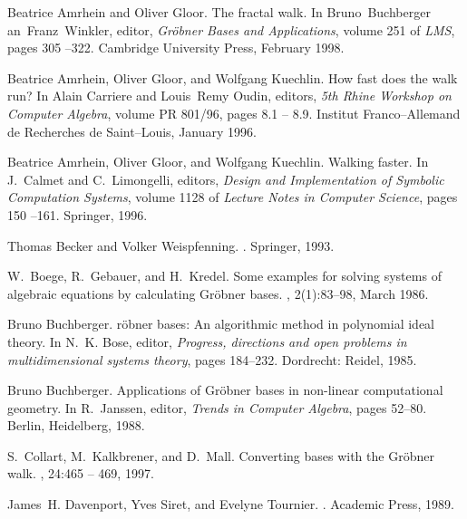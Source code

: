 \begin{thebibliography}{10}

Beatrice Amrhein and Oliver Gloor.
\newblock The fractal walk.
\newblock In Bruno~Buchberger an~Franz~Winkler, editor, {\em Gr\"obner Bases
  and Applications}, volume 251 of {\em LMS}, pages 305 --322. Cambridge
  University Press, February 1998.

Beatrice Amrhein, Oliver Gloor, and Wolfgang Kuechlin.
\newblock How fast does the walk run?
\newblock In Alain Carriere and Louis~Remy Oudin, editors, {\em 5th Rhine
  Workshop on Computer Algebra}, volume PR 801/96, pages 8.1 -- 8.9. Institut
  Franco--Allemand de Recherches de Saint--Louis, January 1996.

Beatrice Amrhein, Oliver Gloor, and Wolfgang Kuechlin.
\newblock Walking faster.
\newblock In J.~Calmet and C.~Limongelli, editors, {\em Design and
  Implementation of Symbolic Computation Systems}, volume 1128 of {\em Lecture
  Notes in Computer Science}, pages 150 --161. Springer, 1996.

Thomas Becker and Volker Weispfenning.
.
\newblock Springer, 1993.

W.~Boege, R.~Gebauer, and H.~Kredel.
\newblock Some examples for solving systems of algebraic equations by
  calculating {G}r{\"o}bner bases.
, 2(1):83--98, March 1986.

Bruno Buchberger.
r{\"o}bner bases: An algorithmic method in polynomial ideal
  theory.
\newblock In N.~K. Bose, editor, {\em Progress, directions and open problems in
  multidimensional systems theory}, pages 184--232. Dordrecht: Reidel, 1985.

Bruno Buchberger.
\newblock Applications of {G}r{\"o}bner bases in non-linear computational
  geometry.
\newblock In R.~Janssen, editor, {\em Trends in Computer Algebra}, pages
  52--80. Berlin, Heidelberg, 1988.

S.~Collart, M.~Kalkbrener, and D.~Mall.
\newblock Converting bases with the {G}r\"obner walk.
, 24:465 -- 469, 1997.

James~H. Davenport, Yves Siret, and Evelyne Tournier.
.
\newblock Academic Press, 1989.


\end{thebibliography}
